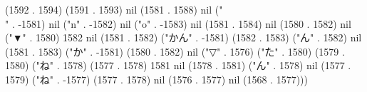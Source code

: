 (1592 . 1594) (1591 . 1593) nil (1581 . 1588) nil ("\\" . -1581) nil ("n" . -1582) nil ("o" . -1583) nil (1581 . 1584) nil (1580 . 1582) nil ("▼" . 1580) 1582 nil (1581 . 1582) ("かん" . -1581) (1582 . 1583) ("ん" . 1582) nil (1581 . 1583) ("か" . -1581) (1580 . 1582) nil ("▽" . 1576) ("た" . 1580) (1579 . 1580) ("ね" . 1578) (1577 . 1578) 1581 nil (1578 . 1581) ("ん" . 1578) nil (1577 . 1579) ("ね" . -1577) (1577 . 1578) nil (1576 . 1577) nil (1568 . 1577)))
